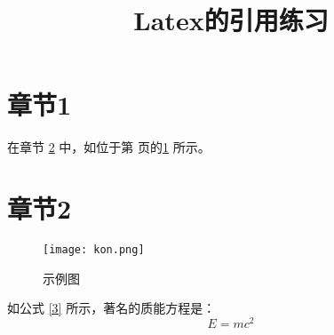 \documentclass[UTF8]{article}
\title{Latex的引用练习}
\begin{document}
\section{章节1}
\label{sec:intro}

在章节 \ref{1} 中，如位于第 \pageref{2} 页的\ref{2} 所示。

\section{章节2}
\label{1} %

\begin{figure}[htbp]
    \centering
    \texttt{[image: kon.png]}
    \caption{示例图}
    \label{2} %
\end{figure}

如公式 \ref{3} 所示，著名的质能方程是：
\begin{equation}
E = mc^2
\label{3} 
\end{equation}
\end{document}
